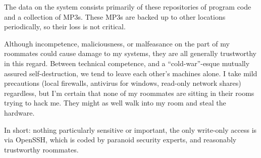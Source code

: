 \documentclass[11pt]{article}
\begin{document}
The data on the system consists primarily of these repositories of 
program code and a collection of MP3s.  
These MP3s are backed up to other locations periodically, so their loss is not
critical. 

Although incompetence, maliciousness, or malfeasance on the part of my 
roommates could cause damage to my systems, they are all generally trustworthy
in this regard.  Between technical competence, and a ``cold-war''\--esque 
mutually assured self-destruction, we tend to leave each other's machines 
alone.  I take mild precautions (local firewalls, antivirus for windows,
read\--only network shares) regardless, but I'm certain that none of my 
roommates are sitting in their rooms trying to hack me.  They might as well
walk into my room and steal the hardware.

In short: nothing particularly sensitive or important,
the only write-only access is via OpenSSH, which is coded by paranoid 
security experts, and reasonably trustworthy roommates.
\end{document}
